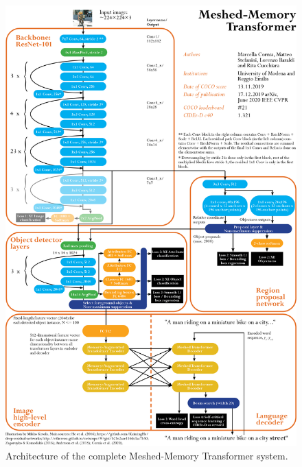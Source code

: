 \documentclass[english,twoside,openright]{HYgraduMLDS}
\begin{document}
\pagebreak
\begin{figure}[H] 
\centering
\includegraphics[width=1.0\textwidth]{./images-indesign/Architecture_M2.png}
\caption{Architecture of the complete Meshed-Memory Transformer system.}
\label{fig:architecture_M2} 
\end{figure}
\end{document}
